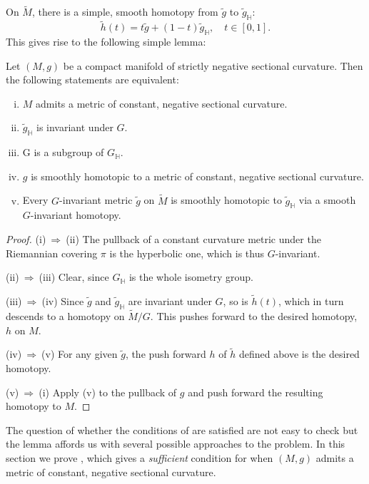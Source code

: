\documentclass{cambridge7a}
\renewcommand{\~}{\tilde}
\renewcommand{\-}{\bar}
\renewcommand{\H}{\mathbb{H}}
\newcommand{\8}{\infty}
\begin{document}
On \(\tilde{M}\), there is a simple, smooth homotopy from \(\tilde{g}\) to \(\tilde{g}_{\H}\):
\[
\tilde{h}(t) = t\tilde{g} + (1-t)\tilde{g}_{\H}, \quad t \in [0, 1].
\]
This gives rise to the following simple lemma:

\begin{lemma}
\label{lem:const_neg}

Let \((M, g)\) be a compact manifold of strictly negative sectional curvature. Then the following statements are equivalent:
\begin{enumerate}[(i)]
\item \label{enum:neg_met} \(M\) admits a metric of constant, negative sectional curvature.
\item \label{enum:deck_met} \(\tilde{g}_{\H}\) is invariant under \(G\).
\item \label{enum:subgroup} G is a subgroup of \(G_{\H}\).
\item \label{enum:homo_met} \(g\) is smoothly homotopic to a metric of constant, negative sectional curvature.
\item \label{enum:homo_deck} Every \(G\)-invariant metric \(\tilde{g}\) on \(\tilde{M}\) is smoothly homotopic to \(\tilde{g}_{\H}\) via a smooth \(G\)-invariant homotopy.
\end{enumerate}
\end{lemma}

\begin{proof}
(i)\(\ \Rightarrow\ \)(ii)
The pullback of a constant curvature metric under the Riemannian covering $\pi$ is the hyperbolic one, which is thus \(G\)-invariant.

(ii)\(\ \Rightarrow\ \)(iii)
Clear, since \(G_{\H}\) is the whole isometry group.

(iii)\(\ \Rightarrow\ \)(iv)
Since \(\tilde{g}\) and \(\tilde{g}_{\H}\) are invariant under \(G\), so is \(\tilde{h}(t)\), which in turn descends to a homotopy on \(\tilde{M}/G\). This pushes forward to the desired homotopy, \(h\) on \(M\).

(iv)\(\ \Rightarrow\ \)(v)
For any given \(\tilde{g}\), the push forward \(h\) of \(\tilde{h}\) defined above is the desired homotopy.

(v)\(\ \Rightarrow\ \)(i)
Apply (v) to the pullback of \(g\) and push forward the resulting homotopy to \(M\).
\end{proof}

The question of whether the conditions of  are satisfied are not easy to check but the lemma affords us with several possible approaches to the problem. In this section we prove  , which gives a \emph{sufficient} condition for when \((M, g)\) admits a metric of constant, negative sectional curvature.
\end{document}
